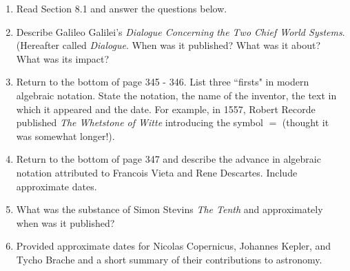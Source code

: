 \documentclass[12pt]{article}
\begin{document}
\begin{enumerate}
\item Read Section 8.1 and answer the questions below.
\item Describe Galileo Galilei's \textit{Dialogue Concerning the Two Chief World Systems}. (Hereafter called \textit{Dialogue}. When was it published? What was it about? What was its impact?
\vfill
\item Return to the bottom of page 345 - 346. List three ``firsts" in modern algebraic notation. State the notation, the name of the inventor, the text in which it appeared and the date. For example, in 1557, Robert Recorde published \textit{The Whetstone of Witte} introducing the symbol $=$ (thought it was somewhat longer!).
\vfill
\item Return to the bottom of page 347 and describe the advance in algebraic notation attributed to Francois Vieta and Rene Descartes. Include approximate dates.
\vfill
\item What was the substance of Simon Stevins \textit{The Tenth} and approximately when was it published?
\vfill
\item Provided approximate dates for Nicolas Copernicus, Johannes Kepler, and Tycho Brache and a short summary of their contributions to astronomy.
\vfill
\end{enumerate}
\end{document}
